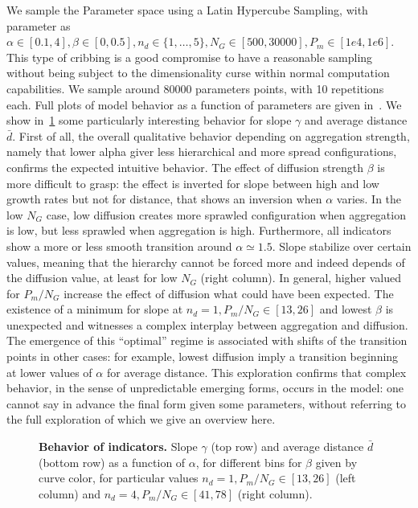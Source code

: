 \documentclass[10pt,letterpaper]{article}
\begin{document}
We sample the Parameter space using a Latin Hypercube Sampling, with parameter as $\alpha \in [0.1,4],\beta \in [0,0.5],n_d \in \{1,\ldots , 5\}, N_G \in [500,30000], P_m \in [1e4,1e6]$. This type of cribbing is a good compromise to have a reasonable sampling without being subject to the dimensionality curse within normal computation capabilities. We sample around 80000 parameters points, with 10 repetitions each. Full plots of model behavior as a function of parameters are given in~. We show in~\ref{fig:fig3} some particularly interesting behavior for slope $\gamma$ and average distance $\bar{d}$. First of all, the overall qualitative behavior depending on aggregation strength, namely that lower alpha giver less hierarchical and more spread configurations, confirms the expected intuitive behavior. The effect of diffusion strength $\beta$ is more difficult to grasp: the effect is inverted for slope between high and low growth rates but not for distance, that shows an inversion when $\alpha$ varies. In the low $N_G$ case, low diffusion creates more sprawled configuration when aggregation is low, but less sprawled when aggregation is high. Furthermore, all indicators show a more or less smooth transition around $\alpha \simeq 1.5$. Slope stabilize over certain values, meaning that the hierarchy cannot be forced more and indeed depends of the diffusion value, at least for low $N_G$ (right column). In general, higher valued for $P_m/N_G$ increase the effect of diffusion what could have been expected. The existence of a minimum for slope at $n_d=1,P_m/N_G\in\left[13,26\right]$ and lowest $\beta$ is unexpected and witnesses a complex interplay between aggregation and diffusion. The emergence of this ``optimal'' regime is associated with shifts of the transition points in other cases: for example, lowest diffusion imply a transition beginning at lower values of $\alpha$ for average distance. This exploration confirms that complex behavior, in the sense of unpredictable emerging forms, occurs in the model: one cannot say in advance the final form given some parameters, without referring to the full exploration of which we give an overview here.




\begin{figure}
\caption{\textbf{Behavior of indicators.} Slope $\gamma$ (top row) and average distance $\bar{d}$ (bottom row) as a function of $\alpha$, for different bins for $\beta$ given by curve color, for particular values $n_d=1,P_m/N_G\in\left[13,26\right]$ (left column) and $n_d=4,P_m/N_G\in\left[41,78\right]$ (right column).}
\label{fig:fig3}
\end{figure}
\end{document}
